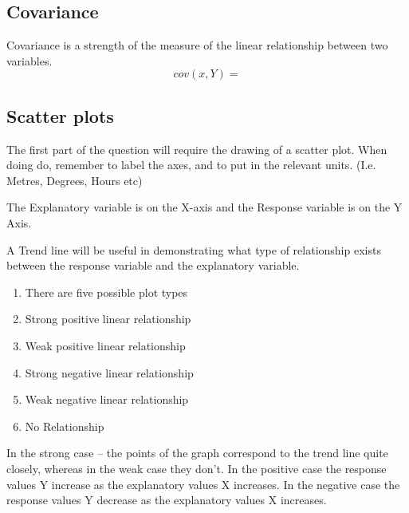 \documentclass[]{report}
\begin{document}
%


\newpage
\subsection{Covariance}
Covariance is a strength of the measure of the linear relationship between two variables.
\[ cov(x,Y) = \]




\subsection{Scatter plots}

The first part of the question will require the drawing of a scatter plot. 
When doing do, remember to label the axes, and to put in the relevant units. (I.e. Metres, Degrees, Hours etc)

The Explanatory variable is on the X-axis and the Response variable is on the Y Axis.

A Trend line will be useful in demonstrating what type of relationship exists between the response variable and the explanatory variable.

\begin{enumerate}
	\item There are five possible plot types
	\item Strong positive linear relationship 
	\item Weak positive linear relationship
	\item Strong negative linear relationship
	\item Weak negative linear relationship
	\item No Relationship
\end{enumerate}
In the strong case – the points of the graph correspond to the trend line quite closely, whereas in the weak case they don’t.
In the positive case the response values Y increase as the explanatory values X increases. In the negative case the response values Y decrease as the explanatory values X increases. 


\end{document}
